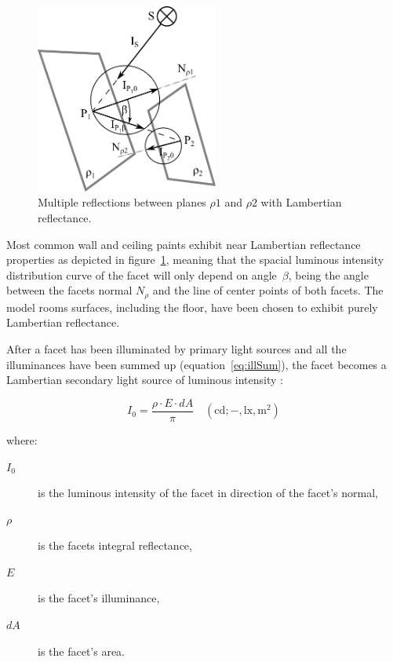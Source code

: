 \begin{figure}[htb]
  \centering
  \includegraphics[width=170pt]{diffuseReflection}
  \caption{Multiple reflections between planes $\rho1$ and $\rho2$ with Lambertian reflectance.}
  \label{fig:difRefl}
\end{figure}

Most common wall and ceiling paints exhibit near Lambertian reflectance properties as depicted in figure~\ref{fig:difRefl}, meaning that the spacial luminous intensity distribution curve of the facet will only depend on angle~$\beta$, being the angle between the facets normal $N_{\rho}$ and the line of center points of both facets. The model rooms surfaces, including the floor, have been chosen to exhibit purely Lambertian reflectance.

After a facet has been illuminated by primary light sources and all the illuminances have been summed up (equation~\ref{eq:illSum}), the facet becomes a Lambertian secondary light source of luminous intensity \cite{Habel}:

\begin{equation}
I_{0}=\frac{\rho \cdot E \cdot dA}{\pi} \quad \mathrm{(cd;-,lx,m^{2})}
\label{eq:lumInt}
\end{equation}

where:
\begin{description}
	\item[$I_{0}$] is the luminous intensity of the facet in direction of the facet's normal,
	\item[$\rho$] is the facets integral reflectance,
	\item[$E$] is the facet's illuminance,
	\item[$dA$] is the facet's area.
\end{description}



